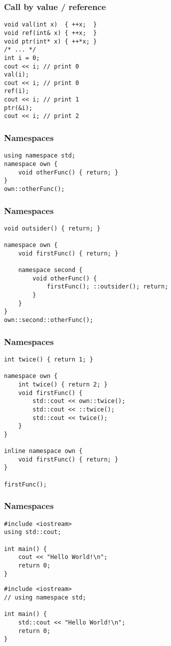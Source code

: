\begin{frame}[fragile]
    \frametitle{Call by value / reference}
        \begin{lstlisting}
void val(int x)  { ++x;  }
void ref(int& x) { ++x;  }
void ptr(int* x) { ++*x; }
/* ... */
int i = 0;
cout << i; // print 0
val(i);
cout << i; // print 0
ref(i);
cout << i; // print 1
ptr(&i);
cout << i; // print 2
        \end{lstlisting}
\end{frame}

\begin{frame}[fragile]
    \frametitle{Namespaces}
    
    \begin{lstlisting}
using namespace std;
namespace own {
    void otherFunc() { return; }
}
own::otherFunc();
    \end{lstlisting}
\end{frame}

\begin{frame}[fragile]
    \frametitle{Namespaces}
    \begin{lstlisting}
void outsider() { return; }

namespace own {
    void firstFunc() { return; }

    namespace second {
        void otherFunc() {
            firstFunc(); ::outsider(); return;
        }
    }
}
own::second::otherFunc();
    \end{lstlisting}
\end{frame}

\begin{frame}[fragile]
    \frametitle{Namespaces}
    \begin{lstlisting}
int twice() { return 1; }

namespace own {
    int twice() { return 2; }
    void firstFunc() {
        std::cout << own::twice();
        std::cout << ::twice();
        std::cout << twice();
    }
}

inline namespace own {
    void firstFunc() { return; }
}

firstFunc();
    \end{lstlisting}
\end{frame}

\begin{frame}[fragile]
    \frametitle{Namespaces}
    \begin{lstlisting}
#include <iostream>
using std::cout;

int main() {
    cout << "Hello World!\n";
    return 0;
}
    \end{lstlisting}
    \begin{lstlisting}
#include <iostream>
// using namespace std;

int main() {
    std::cout << "Hello World!\n";
    return 0;
}
    \end{lstlisting}
\end{frame}



